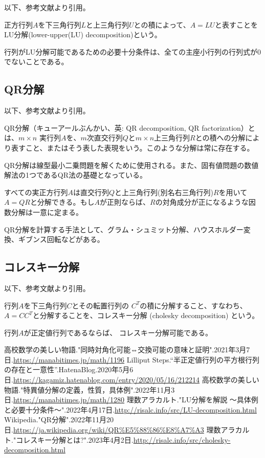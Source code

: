 \documentclass[a4paper, 10pt, dvipdfmx]{jlreq}
\begin{document}
以下、参考文献\cite{site:4}より引用。

正方行列$A$を下三角行列$L$と上三角行列$U$との積によって、$A=LU$と表すことをLU分解(lower-upper(LU) decomposition)という。

行列がLU分解可能であるための必要十分条件は、全ての主座小行列の行列式が0でないことである。

\subsection*{QR分解}

以下、参考文献\cite{site:5}より引用。

QR分解（キューアールぶんかい、英: QR decomposition, QR factorization）とは、$m \times n$ 実行列$A$を、$m$次直交行列$Q$と$m \times  n$上三角行列$R$との積への分解により表すこと、またはそう表した表現をいう。このような分解は常に存在する。

QR分解は線型最小二乗問題を解くために使用される。また、固有値問題の数値解法の1つであるQR法の基礎となっている。

すべての実正方行列$A$は直交行列$Q$と上三角行列(別名右三角行列)$R$を用いて$A=QR$と分解できる。もし$A$が正則ならば、$R$の対角成分が正になるような因数分解は一意に定まる。

QR分解を計算する手法として、グラム・シュミット分解、ハウスホルダー変換、ギブンス回転などがある。

\subsection*{コレスキー分解}

以下、参考文献\cite{site:6}より引用。

行列$A$を下三角行列$C$とその転置行列の $C^T$の積に分解すること、すなわち、$A=CC^T$と分解することを、コレスキー分解 (cholesky decomposition) という。

行列$A$が正定値行列であるならば、 コレスキー分解可能である。

\begin{thebibliography}{9}
  高校数学の美しい物語."同時対角化可能⇔交換可能の意味と証明".2021年3月7日.\url{https://manabitimes.jp/math/1196}
  Lilliput Steps.“半正定値行列の平方根行列の存在と一意性”.HatenaBlog.2020年5月6日.\url{https://kagamiz.hatenablog.com/entry/2020/05/16/212214}
  高校数学の美しい物語."特異値分解の定義，性質，具体例".2022年11月3日.\url{https://manabitimes.jp/math/1280}
  理数アラカルト."LU分解を解説 ～具体例と必要十分条件～".2022年4月17日.\url{http://risalc.info/src/LU-decomposition.html}
  Wikipedia."QR分解".2022年11月20日.\url{https://ja.wikipedia.org/wiki/QR%E5%88%86%E8%A7%A3}
  理数アラカルト."コレスキー分解とは?".2023年4月2日.\url{http://risalc.info/src/cholesky-decomposition.html}
\end{thebibliography}
\end{document}
